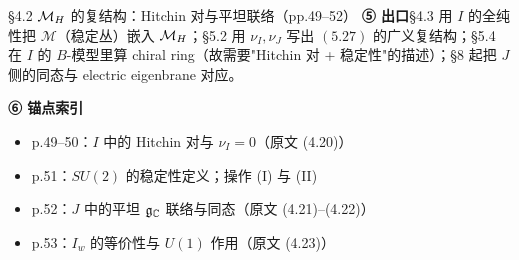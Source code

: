 \begin{kcard}{§4.2 $\mathcal{M}_H$ 的复结构：Hitchin 对与平坦联络（pp.49--52）}
\noindent\textbf{⑤ 出口}\quad \S4.3 用 $I$ 的全纯性把 $\mathcal M$（稳定丛）嵌入 $\mathcal{M}_H$；\S5.2 用 $\nu_I,\nu_J$ 写出 $(5.27)$ 的广义复结构；\S5.4 在 $I$ 的 $B$-模型里算 chiral ring（故需要"Hitchin 对 + 稳定性"的描述）；\S8 起把 $J$ 侧的同态与 electric eigenbrane 对应。\pB{}

\noindent\textbf{⑥ 锚点索引}\quad
\begin{itemize}
\item p.49--50：$I$ 中的 Hitchin 对与 $\nu_I=0$（原文 (4.20)）
\item p.51：$SU(2)$ 的稳定性定义；操作 (I) 与 (II)
\item p.52：$J$ 中的平坦 $\mathfrak{g}_{\mathbb{C}}$ 联络与同态（原文 (4.21)--(4.22)）
\item p.53：$I_w$ 的等价性与 $U(1)$ 作用（原文 (4.23)）
\end{itemize}
\end{kcard}

\noindent{}

\noindent{}

